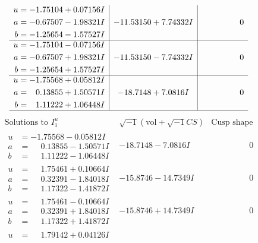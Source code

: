 \documentclass[1p]{elsarticle_modified}
\theoremstyle{definition}
\newcommand{\I}{\sqrt{-1}}
\begin{document}
$$\begin{array}{c|c|c}
\begin{aligned}
u &= -1.75104 + 0.07156 I \\
a &= -0.67507 - 1.98321 I \\
b &= -1.25654 - 1.57527 I\end{aligned}
 & -11.53150 + 7.74332 I & \phantom{-0.000000 } 0 \\ \hline\begin{aligned}
u &= -1.75104 - 0.07156 I \\
a &= -0.67507 + 1.98321 I \\
b &= -1.25654 + 1.57527 I\end{aligned}
 & -11.53150 - 7.74332 I & \phantom{-0.000000 } 0 \\ \hline\begin{aligned}
u &= -1.75568 + 0.05812 I \\
a &= \phantom{-}0.13855 + 1.50571 I \\
b &= \phantom{-}1.11222 + 1.06448 I\end{aligned}
 & -18.7148 + 7.0816 I & \phantom{-0.000000 } 0\\
 \hline 
 \end{array}$$\newpage$$\begin{array}{c|c|c}  
\text{Solutions to }I^u_{1}& \I (\text{vol} + \sqrt{-1}CS) & \text{Cusp shape}\\
 \hline 
\begin{aligned}
u &= -1.75568 - 0.05812 I \\
a &= \phantom{-}0.13855 - 1.50571 I \\
b &= \phantom{-}1.11222 - 1.06448 I\end{aligned}
 & -18.7148 - 7.0816 I & \phantom{-0.000000 } 0 \\ \hline\begin{aligned}
u &= \phantom{-}1.75461 + 0.10664 I \\
a &= \phantom{-}0.32391 - 1.84018 I \\
b &= \phantom{-}1.17322 - 1.41872 I\end{aligned}
 & -15.8746 - 14.7349 I & \phantom{-0.000000 } 0 \\ \hline\begin{aligned}
u &= \phantom{-}1.75461 - 0.10664 I \\
a &= \phantom{-}0.32391 + 1.84018 I \\
b &= \phantom{-}1.17322 + 1.41872 I\end{aligned}
 & -15.8746 + 14.7349 I & \phantom{-0.000000 } 0 \\ \hline\begin{aligned}
u &= \phantom{-}1.79142 + 0.04126 I \\

\end{aligned}
\end{array}$$
\end{document}
